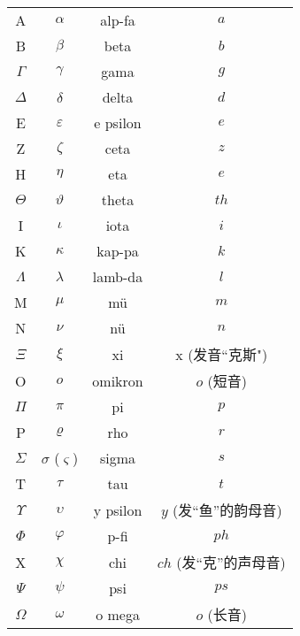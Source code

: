 
\begin{table}[h]
\centering

\begin{tabular}{|c|c|c|c|}

\hline


A & $\alpha$ & alp-fa & $a$ \\

B & $\beta$ & beta & $b$ \\

$\Gamma$ & $\gamma$ & gama & $g$ \\

$\Delta$ & $\delta$ & delta & $d$ \\

E & $\varepsilon$ & e psilon & $e$ \\

Z & $\zeta$ & ceta & $z$ \\

H & $\eta$ & eta & $e$ \\

$\Theta$ & $\vartheta$ & theta & $th$ \\

I & $\iota$ & iota & $i$ \\

K & $\kappa$ & kap-pa & $k$ \\

$\Lambda$ & $\lambda$ & lamb-da & $l$ \\

M & $\mu$ & m\"{u} & $m$ \\

N & $\nu$ & n\"{u} & $n$ \\

$\Xi$ & $\xi$ & xi & x (发音``克斯") \\

O & $o$ & omikron & $o$ (短音) \\

$\Pi$ & $\pi$ & pi & $p$ \\

P & $\varrho$ & rho & $r$ \\

$\Sigma$ & $\sigma$ ($\varsigma$) & sigma & $s$ \\

T & $\tau$ & tau & $t$ \\

$\Upsilon$ & $\upsilon$ & y psilon & $y$ (发``鱼''的韵母音) \\

$\Phi$ & $\varphi$ & p-fi & $ph$ \\

X & $\chi$ & chi & $ch$ (发``克''的声母音) \\

$\Psi$ & $\psi$ & psi & $ps$ \\

$\Omega$ & $\omega$ & o mega & $o$ (长音) \\

\hline
\end{tabular}
\end{table}



